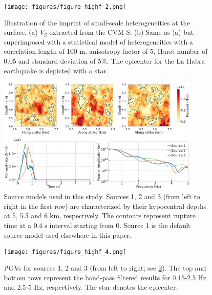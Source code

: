\begin{figure}[!ht]
  \centering
  \texttt{[image: figures/figure\_highf\_2.png]}
  \caption{Illustration of the imprint of small-scale heterogeneities at the surface. (a) $V_S$ extracted from the CVM-S. (b) Same as (a) but superimposed with a statistical model of heterogeneities with a correlation length of 100 m, anisotropy factor of 5, Hurst number of 0.05 and standard deviation of 5\%. The epicenter for the La Habra earthquake is depicted with a star.}
  \label{fig:highf-2}
\end{figure}
\clearpage

\begin{figure}[!ht]
  \includegraphics[width=0.9\textwidth,height=0.9\textheight,keepaspectratio]{figures/figure_highf_3.pdf}
  \caption{Source models used in this study. Sources 1, 2 and 3 (from left to right in the first row) are characterized by their hypocentral depths at 5, 5.5 and 6 km, respectively. The contours represent rupture time at a 0.4 s interval starting from 0. Source 1 is the default source model used elsewhere in this paper.}
  \label{fig:highf-3}
\end{figure}
\clearpage

\begin{figure}[!ht]
  \texttt{[image: figures/figure\_highf\_4.png]}
  \caption{PGVs for sources 1, 2 and 3 (from left to right; see \cref{fig:highf-3}). The top and bottom rows represent the band-pass filtered results for 0.15-2.5 Hz and 2.5-5 Hz, respectively. The star denotes the epicenter.}
  \label{fig:highf-4}
\end{figure}
\clearpage

